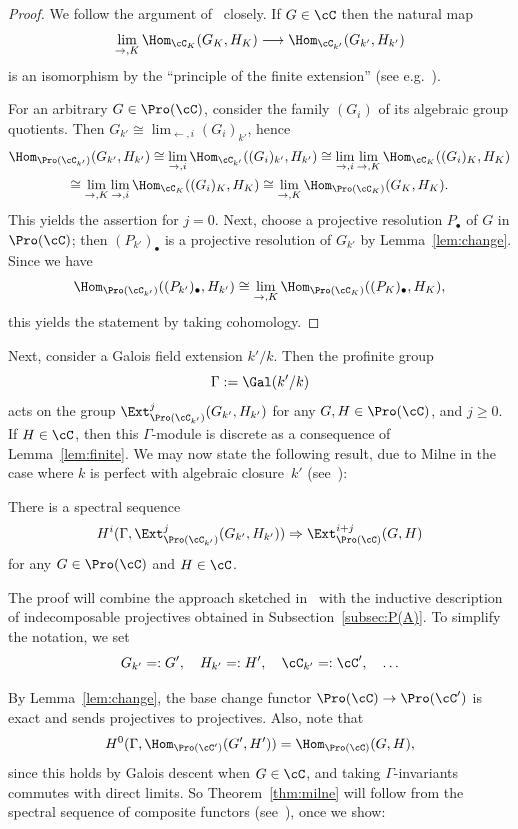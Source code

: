 \begin{proof}
We follow the argument of~\cite[V.3.2.3]{DG} closely. If $G \in \cC$ then the natural map
\[
\lim_{\to,K} \Hom_{\cC_K}(G_K,H_K)
\longrightarrow \Hom_{\cC_{k'}}(G_{k'},H_{k'})
\]
is an isomorphism by the ``principle of the finite extension'' (see e.g.~\cite[I.3.2.2]{DG}).

For an arbitrary $G \in \Pro(\cC)$, consider the family $(G_i)$ of its algebraic group quotients. Then $G_{k'} \cong \lim_{\leftarrow,i} (G_i)_{k'}$, hence
\begin{multline*}
\Hom_{\Pro(\cC_{k'})}(G_{k'},H_{k'})
\cong
\lim_{\to,i} \Hom_{\cC_{k'}}((G_i)_{k'},H_{k'})
\cong
\lim_{\to,i} \lim_{\to,K} \Hom_{\cC_K}((G_i)_K,H_K)
\\
\cong
\lim_{\to,K} \lim_{\to,i} \Hom_{\cC_K}((G_i)_K,H_K)
\cong
\lim_{\to,K} \Hom_{\Pro(\cC_K)}(G_K,H_K).
\end{multline*}
This yields the assertion for $j = 0$. Next, choose a projective resolution $P_{\bullet}$ of $G$ in $\Pro(\cC)$; then $(P_{k'})_{\bullet}$ is a projective resolution of $G_{k'}$ by Lemma~\ref{lem:change}. Since we have
\[
\Hom_{\Pro(\cC_{k'})}((P_{k'})_{\bullet}, H_{k'}) \cong
\lim_{\to,K} \Hom_{\Pro(\cC_K)}((P_K)_{\bullet}, H_K),
\]
this yields the statement by taking cohomology.
\end{proof}

Next, consider a Galois field extension $k'/k$. Then the profinite group
\[
\Gamma := \Gal(k'/k)
\]
acts on the group $\Ext^j_{\Pro(\cC_{k'})}(G_{k'}, H_{k'})$ for any $G,H \in \Pro(\cC)$, and $j \geq 0$. If $H \in \cC$, then this $\Gamma$-module is discrete as a consequence of Lemma~\ref{lem:finite}. We may now state the following result, due to Milne in the case where $k$ is perfect with algebraic closure~$k'$ (see~\cite[Prop., p.~437]{Milne}):

\begin{theo}\label{thm:milne}
There is a spectral sequence
\[
H^i(\Gamma, \Ext^j_{\Pro(\cC_{k'})}(G_{k'}, H_{k'}))
\Rightarrow \Ext^{i + j}_{\Pro(\cC)}(G, H)
\]
for any $G \in \Pro(\cC)$ and $H \in \cC$.
\end{theo}

The proof will combine the approach sketched in~\cite{Milne} with the inductive description of indecomposable projectives obtained in Subsection~\ref{subsec:P(A)}. To simplify the notation, we set
\[
G_{k'} =: G', \quad H_{k'} =: H', \quad \cC_{k'} =: \cC', \quad \ldots
\]

By Lemma~\ref{lem:change}, the base change functor $\Pro(\cC) \to \Pro(\cC')$ is exact and sends projectives to projectives. Also, note that
\[
H^0(\Gamma, \Hom_{\Pro(\cC')}(G', H')) = \Hom_{\Pro(\cC)}(G,H),
\]
since this holds by Galois descent when $G \in \cC$, and taking $\Gamma$-invariants commutes with direct limits. So Theorem~\ref{thm:milne} will follow from the spectral sequence of composite functors (see~\cite[Thm.~2.4.1]{Grothendieck}), once we show:


